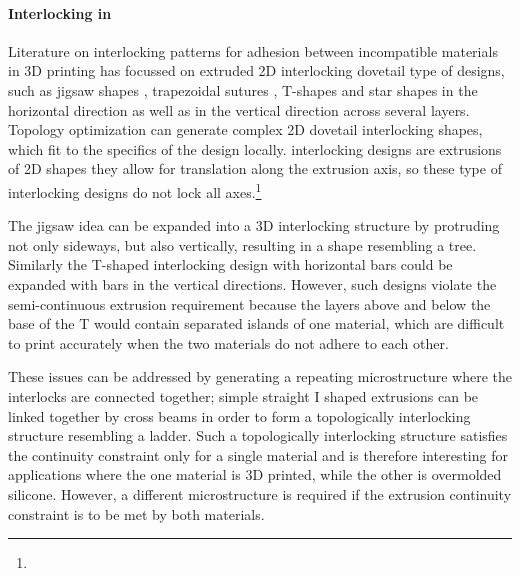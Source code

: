 \paragraph{Interlocking in }

Literature on interlocking patterns for adhesion between incompatible materials in  3D printing has focussed on extruded 2D interlocking dovetail type of designs,
such as jigsaw shapes \cite{malik2017}, trapezoidal sutures \cite{Li2013}, T-shapes\cite{Ribeiro2019,mustafa2021development} and star shapes\cite{Wang2021} in the horizontal direction
as well as in the vertical direction across several layers\cite{debora2020}.
Topology optimization can generate complex 2D dovetail interlocking shapes, which fit to the specifics of the design locally\cite{aharoni2021}.
 interlocking designs are extrusions of 2D shapes they allow for translation along the extrusion axis, so these type of interlocking designs do not lock all axes.\footnote{}

The jigsaw idea can be expanded into a 3D interlocking structure by protruding not only sideways, but also vertically, resulting in a shape resembling a tree\cite{gouker2006manufacturing}.
Similarly the T-shaped interlocking design with horizontal bars could be expanded with bars in the vertical directions.
However, such designs violate the semi-continuous extrusion requirement because the layers above and below the base of the T would contain separated islands of one material, 
which are difficult to print accurately when the two materials do not adhere to each other.

These issues can be addressed by generating a repeating microstructure where the interlocks are connected together;
simple straight I shaped extrusions can be linked together by cross beams in order to form a topologically interlocking structure resembling a ladder\cite{Rossing2020}.
Such a topologically interlocking structure satisfies the continuity constraint only for a single material and is therefore interesting for applications where the one material is 3D printed, while the other is overmolded silicone.
However, a different microstructure is required if the extrusion continuity constraint is to be met by both materials.

